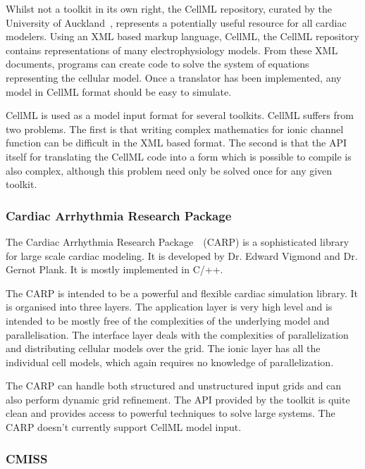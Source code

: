 Whilst not a toolkit in its own right, the CellML repository, curated by the
University of Auckland~\cite{Lloyd2008}, represents a potentially useful
resource for all cardiac modelers.
Using an XML based markup language, CellML, the CellML repository contains
representations of many electrophysiology models.
From these XML documents, programs can create code to solve the system of
equations representing the cellular model.
Once a translator has been implemented, any model in CellML format should be
easy to simulate.

CellML is used as a model input format for several toolkits.
CellML suffers from two problems.
The first is that writing complex mathematics for ionic channel function can be
difficult in the XML based format.
The second is that the API itself for translating the CellML code into a form
which is possible to compile is also complex, although this problem need only be
solved once for any given toolkit.


\subsubsection{Cardiac Arrhythmia Research Package}

The Cardiac Arrhythmia Research Package~\cite{Bauer2007,Plank2005,Vigmond2007}\
(CARP) is a sophisticated library for large scale cardiac modeling.
It is developed by Dr. Edward Vigmond and Dr. Gernot Plank.
It is mostly implemented in C/++.

The CARP is intended to be a powerful and flexible cardiac simulation library.
It is organised into three layers.
The application layer is very high level and is intended to be mostly free of
the complexities of the underlying model and parallelisation.
The interface layer deals with the complexities of parallelization and
distributing cellular models over the grid.
The ionic layer has all the individual cell models, which again requires no
knowledge of parallelization.

The CARP can handle both structured and unstructured input grids and can also
perform dynamic grid refinement.
The API provided by the toolkit is quite clean and provides access to powerful
techniques to solve large systems.
The CARP doesn't currently support CellML model input.


\subsubsection{CMISS}

